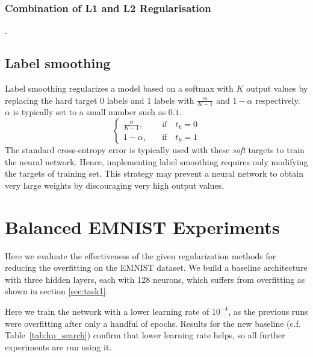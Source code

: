 \documentclass{article}
\begin{document}
\subsubsection{Combination of L1 and L2 Regularisation}
\label{sec:L1L2combo} 

\questionSix.

\subsection{Label smoothing}
Label smoothing regularizes a model based on a softmax with $K$ output values by replacing the hard target 0 labels and 1 labels with $\frac{\alpha}{K-1}$ and $1-\alpha$ respectively. 
$\alpha$ is typically set to a small number such as $0.1$.
\begin{equation}
    \begin{cases}
        \frac{\alpha}{K-1}, & \quad \text{if} \quad t_k=0\\
        1 - \alpha, & \quad \text{if} \quad t_k=1
    \end{cases}    
\end{equation}
The standard cross-entropy error is typically used with these \emph{soft} targets to train the neural network. 
Hence, implementing label smoothing requires only modifying the targets of training set.
This strategy may prevent a neural network to obtain very large weights by discouraging very high output values.

\section{Balanced EMNIST Experiments}\label{sec:balanced-emnist-experiments}

\questionTableThree

\questionFigureFour

\questionTableFour

\questionFigureFive

\questionFigureSix

\label{sec:task2.2}

Here we evaluate the effectiveness of the given regularization methods for reducing the overfitting on the EMNIST dataset.
We build a baseline architecture with three hidden layers, each with 128 neurons, which suffers from overfitting as shown in section \ref{sec:task1}.

Here we train the network with a lower learning rate of $10^{-4}$, as the previous runs were overfitting after only a handful of epochs. 
Results for the new baseline (c.f. Table~\ref{tab:hp_search}) confirm that lower learning rate helps, so all further experiments are run using it.
\end{document}
